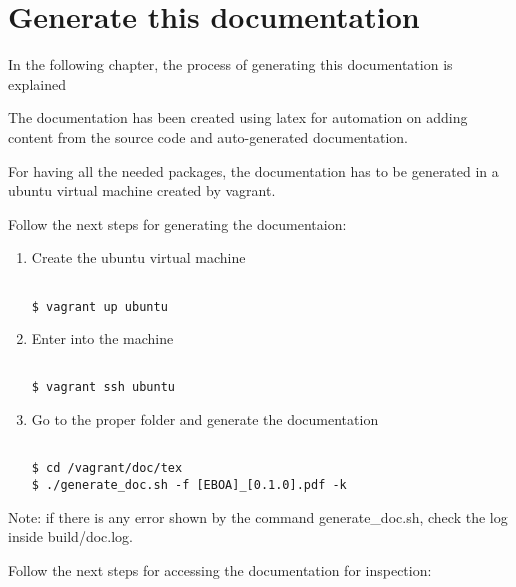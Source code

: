 \chapter{Generate this documentation}

In the following chapter, the process of generating this documentation is explained

The documentation has been created using latex for automation on adding content from the source code and auto-generated documentation.

For having all the needed packages, the documentation has to be generated in a ubuntu virtual machine created by vagrant.

Follow the next steps for generating the documentaion:

\begin{enumerate}

\item Create the ubuntu virtual machine

\begin{lstlisting}[breaklines=true, style=bash]

$ vagrant up ubuntu

\end{lstlisting}

\item Enter into the machine

\begin{lstlisting}[breaklines=true, style=bash]

$ vagrant ssh ubuntu

\end{lstlisting}

\item Go to the proper folder and generate the documentation

\begin{lstlisting}[breaklines=true, style=bash]

$ cd /vagrant/doc/tex
$ ./generate_doc.sh -f [EBOA]_[0.1.0].pdf -k

\end{lstlisting}

\end{enumerate}

Note: if there is any error shown by the command generate\_doc.sh, check the log inside build/doc.log.

Follow the next steps for accessing the documentation for inspection:

